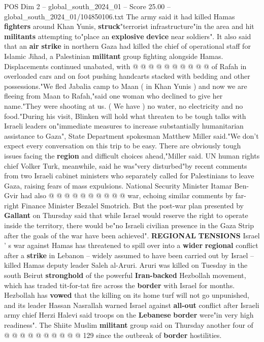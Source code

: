 \begin{textsample}{POS Dim 2 – global\_south\_2024\_01 – Score 25.00 – global\_south\_2024\_01/104850106.txt}
The army said it had killed Hamas \textbf{fighters} around Khan Yunis, \textbf{struck}"terrorist infrastructure"in the area and hit \textbf{militants} attempting to"place an \textbf{explosive} \textbf{device} near soldiers".
It also said that an \textbf{air} \textbf{strike} in northern Gaza had killed the chief of operational staff for Islamic Jihad, a Palestinian \textbf{militant} group fighting alongside Hamas.
Displacements continued unabated, with @ @ @ @ @ @ @ @ @ @ of Rafah in overloaded cars and on foot pushing handcarts stacked with bedding and other possessions."We fled Jabalia camp to Maan ( in Khan Yunis ) and now we are fleeing from Maan to Rafah,"said one woman who declined to give her name."They were shooting at us. ( We have ) no water, no electricity and no food."During his visit, Blinken will hold what threaten to be tough talks with Israeli leaders on"immediate measures to increase substantially humanitarian assistance to Gaza", State Department spokesman Matthew Miller said."We don't expect every conversation on this trip to be easy.
There are obviously tough issues facing the \textbf{region} and difficult choices ahead,"Miller said.
UN human rights chief Volker Turk, meanwhile, said he was"very disturbed"by recent comments from two Israeli cabinet ministers who separately called for Palestinians to leave Gaza, raising fears of mass expulsions.
National Security Minister Itamar Ben-Gvir had also @ @ @ @ @ @ @ @ @ @ war, echoing similar comments by far-right Finance Minister Bezalel Smotrich.
But the post-war plan presented by \textbf{Gallant} on Thursday said that while Israel would reserve the right to operate inside the territory, there would be"no Israeli civilian presence in the Gaza Strip after the goals of the war have been achieved". \textbf{REGIONAL} \textbf{TENSIONS} Israel ' s war against Hamas has threatened to spill over into a \textbf{wider} \textbf{regional} conflict after a \textbf{strike} in Lebanon -- widely assumed to have been carried out by Israel -- killed Hamas deputy leader Saleh al-Aruri.
Aruri was killed on Tuesday in the south Beirut \textbf{stronghold} of the powerful \textbf{Iran-backed} Hezbollah movement, which has traded tit-for-tat fire across the \textbf{border} with Israel for months.
Hezbollah has \textbf{vowed} that the killing on its home turf will not go unpunished, and its leader Hassan Nasrallah warned Israel against \textbf{all-out} conflict after Israeli army chief Herzi Halevi said troops on the \textbf{Lebanese} \textbf{border} were"in very high readiness".
The Shiite Muslim \textbf{militant} group said on Thursday another four of @ @ @ @ @ @ @ @ @ @ 129 since the outbreak of \textbf{border} hostilities.

\end{textsample}
